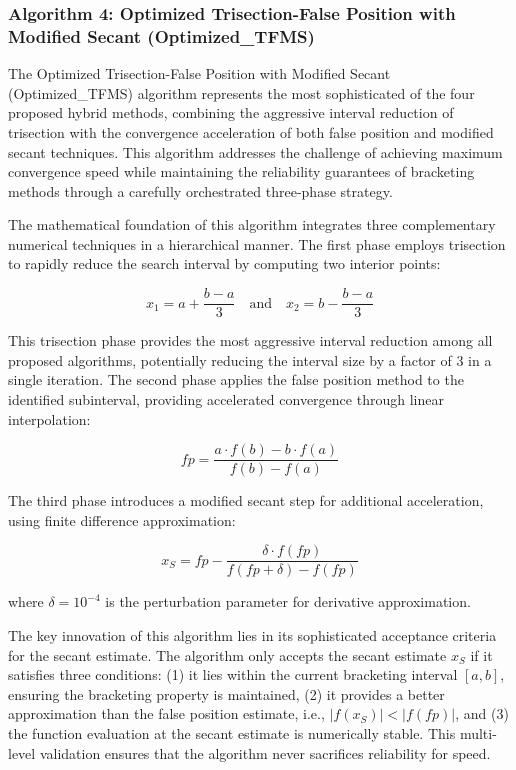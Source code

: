 \documentclass[amsmath, amssymb, aps]{revtex4-2}
\begin{document}
\subsubsection{Algorithm 4: Optimized Trisection-False Position with Modified Secant (Optimized\_TFMS)}

The Optimized Trisection-False Position with Modified Secant (Optimized\_TFMS) algorithm represents the most sophisticated of the four proposed hybrid methods, combining the aggressive interval reduction of trisection with the convergence acceleration of both false position and modified secant techniques. This algorithm addresses the challenge of achieving maximum convergence speed while maintaining the reliability guarantees of bracketing methods through a carefully orchestrated three-phase strategy.

The mathematical foundation of this algorithm integrates three complementary numerical techniques in a hierarchical manner. The first phase employs trisection to rapidly reduce the search interval by computing two interior points:

\begin{equation}
x_1 = a + \frac{b - a}{3} \quad \text{and} \quad x_2 = b - \frac{b - a}{3}
\end{equation}

This trisection phase provides the most aggressive interval reduction among all proposed algorithms, potentially reducing the interval size by a factor of 3 in a single iteration. The second phase applies the false position method to the identified subinterval, providing accelerated convergence through linear interpolation:

\begin{equation}
fp = \frac{a \cdot f(b) - b \cdot f(a)}{f(b) - f(a)}
\end{equation}

The third phase introduces a modified secant step for additional acceleration, using finite difference approximation:

\begin{equation}
x_S = fp - \frac{\delta \cdot f(fp)}{f(fp + \delta) - f(fp)}
\end{equation}

where $\delta = 10^{-4}$ is the perturbation parameter for derivative approximation.

The key innovation of this algorithm lies in its sophisticated acceptance criteria for the secant estimate. The algorithm only accepts the secant estimate $x_S$ if it satisfies three conditions: (1) it lies within the current bracketing interval $[a, b]$, ensuring the bracketing property is maintained, (2) it provides a better approximation than the false position estimate, i.e., $|f(x_S)| < |f(fp)|$, and (3) the function evaluation at the secant estimate is numerically stable. This multi-level validation ensures that the algorithm never sacrifices reliability for speed.
\end{document}
